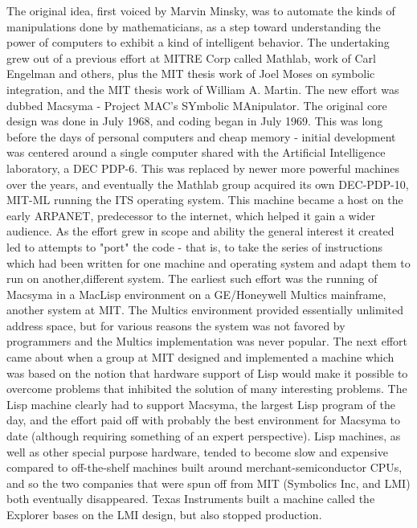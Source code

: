 The original idea, first voiced by Marvin Minsky, was to automate the kinds 
of manipulations done by mathematicians, as a step toward understanding the
power of computers to exhibit a kind of intelligent behavior. \cite{MAC-M-124}
The undertaking grew out of a previous effort at MITRE Corp called Mathlab, 
work of Carl Engelman and others, plus the MIT thesis work of Joel Moses on 
symbolic integration, and the MIT thesis work of William A. Martin. The new
effort was dubbed Macsyma - Project MAC's SYmbolic MAnipulator. The original 
core design was done in July 1968, and coding began in July 1969. This was long
before the days of personal computers and cheap memory - initial development 
was centered around a single computer shared with the Artificial Intelligence 
laboratory, a DEC PDP-6.  This was replaced by newer more powerful machines 
over the years, and eventually the Mathlab group acquired its own DEC-PDP-10, 
MIT-ML running the ITS operating system. This machine became a host on the 
early ARPANET, predecessor to the internet, which helped it gain a
wider audience. As the effort grew in scope and ability the general
interest it created led to attempts to "port" the code - that is, to
take the series of instructions which had been written for one machine
and operating system and adapt them to run on another,different 
system. The earliest such effort was the running of Macsyma in a MacLisp 
environment on a GE/Honeywell Multics mainframe, another system
at MIT. The Multics environment provided essentially unlimited address
space, but for various reasons the system was not favored by 
programmers and the Multics implementation was never popular.
The next effort came about when a group at MIT designed and implemented a machine
which was based on the notion that hardware support of Lisp would make
it possible to overcome problems that inhibited the solution of
many interesting problems.  The Lisp machine clearly had to support 
Macsyma, the largest Lisp program of the day, and the effort paid off with 
probably the best environment for Macsyma to date (although requiring something
of an expert perspective).  Lisp machines, as well as other special
purpose hardware, tended to become slow and expensive compared to
off-the-shelf machines built around merchant-semiconductor CPUs, and
so the two companies that were spun off from MIT (Symbolics Inc, and 
LMI) both eventually disappeared.  Texas Instruments built a machine called
the Explorer bases on the LMI design, but also stopped production.

